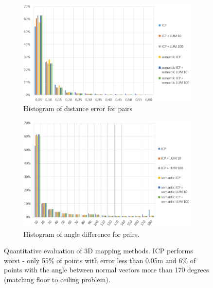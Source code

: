 \documentclass{article}
\begin{document}
\begin{figure}
\centering
 \begin{subfigure} [b]{0.49\textwidth}
         \centering
         \includegraphics[width=\textwidth]{ROB-15-0035_fig31a.png}
         \caption{Histogram of distance error for pairs}
    \end{subfigure}
   \begin{subfigure} [b]{0.49\textwidth}
         \centering
         \includegraphics[width=\textwidth]{ROB-15-0035_fig31b.png}
         \caption{Histogram of angle difference for pairs.}
    \end{subfigure}
\caption{Quantitative evaluation of 3D mapping methods.
ICP performs worst - only 55\% of points with error less than 0.05m and 6\% of points with the angle between normal vectors more than 170 degrees (matching floor to ceiling problem).}
\label{fig:errors}
\end{figure}
\end{document}
